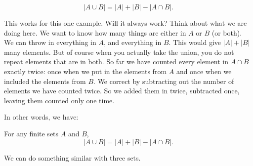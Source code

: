 \documentclass[12pt,]{book}
\theoremstyle{plain}
\theoremstyle{definition}
\theoremstyle{definition}
\theoremstyle{definition}
\numberwithin{equation}{chapter}
\newcommand{\card}[1]{\left| #1 \right|}
\begin{document}
\begin{equation*}
\card{A \cup B} = \card{A} + \card{B} - \card{A \cap B}.
\end{equation*}
%
\par
\hypertarget{p-757}{}%
This works for this one example. Will it always work? Think about what we are doing here. We want to know how many things are either in \(A\) or \(B\) (or both). We can throw in everything in \(A\), and everything in \(B\). This would give \(\card{A} + \card{B}\) many elements. But of course when you actually take the union, you do not repeat elements that are in both. So far we have counted every element in \(A \cap B\) exactly twice: once when we put in the elements from \(A\) and once when we included the elements from \(B\). We correct by subtracting out the number of elements we have counted twice. So we added them in twice, subtracted once, leaving them counted only one time.%
\par
\hypertarget{p-758}{}%
In other words, we have:%
\begin{assemblage}\label{assemblage-16}
\hypertarget{p-759}{}%
For any finite sets \(A\) and \(B\),%
\begin{equation*}
\card{A \cup B} = \card{A} + \card{B} - \card{A \cap B}.
\end{equation*}
%
\end{assemblage}
\hypertarget{p-760}{}%
We can do something similar with three sets.%
\end{document}
